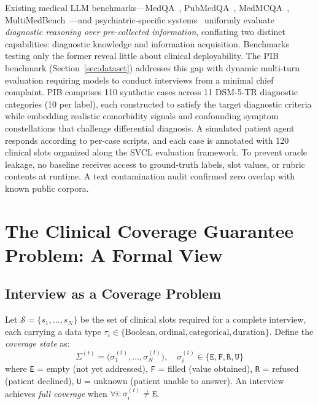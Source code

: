 \documentclass[conference]{IEEEtran}
\begin{document}
Existing medical LLM benchmarks---MedQA~\cite{jin2021disease}, PubMedQA~\cite{jin2019pubmedqa}, MedMCQA~\cite{pal2022medmcqa}, MultiMedBench~\cite{singhal2023large}---and psychiatric-specific systems~\cite{ding2025dale,li2025prenatal,xing2024emo,wang2024scalecot} uniformly evaluate \textit{diagnostic reasoning over pre-collected information}, conflating two distinct capabilities: diagnostic knowledge and information acquisition. Benchmarks testing only the former reveal little about clinical deployability. The PIB benchmark (Section~\ref{sec:dataset}) addresses this gap with dynamic multi-turn evaluation requiring models to conduct interviews from a minimal chief complaint. PIB comprises 110 synthetic cases across 11 DSM-5-TR diagnostic categories (10 per label), each constructed to satisfy the target diagnostic criteria while embedding realistic comorbidity signals and confounding symptom constellations that challenge differential diagnosis. A simulated patient agent responds according to per-case scripts, and each case is annotated with 120 clinical slots organized along the SVCL evaluation framework. To prevent oracle leakage, no baseline receives access to ground-truth labels, slot values, or rubric contents at runtime. A text contamination audit confirmed zero overlap with known public corpora.


\section{The Clinical Coverage Guarantee Problem: A Formal View}

\subsection{Interview as a Coverage Problem}

Let $\mathcal{S} = \{s_1, \ldots, s_N\}$ be the set of clinical slots required for a complete interview, each carrying a data type $\tau_i \in \{\text{Boolean}, \text{ordinal}, \text{categorical}, \text{duration}\}$. Define the \textit{coverage state} as:
\[
\Sigma^{(t)} = \bigl(\sigma_1^{(t)}, \ldots, \sigma_N^{(t)}\bigr),\quad \sigma_i^{(t)} \in \{\texttt{E}, \texttt{F}, \texttt{R}, \texttt{U}\}
\]
where \texttt{E} = empty (not yet addressed), \texttt{F} = filled (value obtained), \texttt{R} = refused (patient declined), \texttt{U} = unknown (patient unable to answer). An interview achieves \textit{full coverage} when $\forall i: \sigma_i^{(t)} \neq \texttt{E}$.
\end{document}
